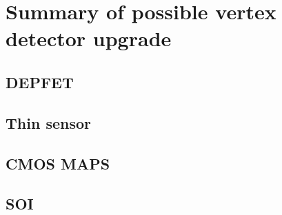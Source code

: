 


\begin{comment}
In particular there are three fundamental aspects in physics performance (concern) in regards to VXD and its upgrade:

\begin{itemize}
\itemsep0em
\item Low momentum track finding; 
\item Vertex and IP resolution;
\item Triggers.
\end{itemize}

\end{comment}


\newpage


\section{Summary of possible vertex detector upgrade}

\subsection{DEPFET}

\subsection{Thin sensor}

\subsection{CMOS MAPS}

\subsection{SOI}